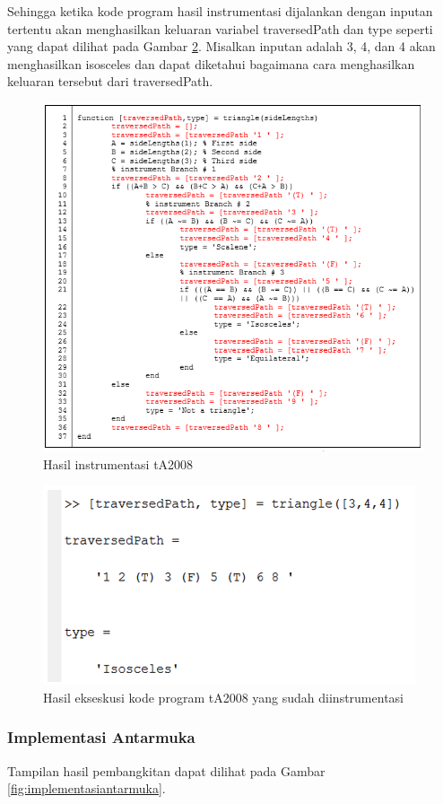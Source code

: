 Sehingga ketika kode program hasil instrumentasi dijalankan dengan inputan tertentu akan menghasilkan keluaran variabel traversedPath dan type seperti yang dapat dilihat pada Gambar \ref{fig:hasilekseskusi}. Misalkan inputan adalah 3, 4, dan 4 akan menghasilkan isosceles dan dapat diketahui bagaimana cara menghasilkan keluaran tersebut dari traversedPath. 
\begin{figure}
	\centering
	\includegraphics[width=0.9\linewidth]{gambar/instrumentasi}
	\caption{Hasil instrumentasi tA2008}
	\label{fig:instrumentasi}
\end{figure}
\begin{figure}
	\centering
	\includegraphics[width=0.7\linewidth]{gambar/hasilekseskusi}
	\caption{Hasil ekseskusi kode program tA2008 yang sudah diinstrumentasi}
	\label{fig:hasilekseskusi}
\end{figure}

\subsubsection*{Implementasi Antarmuka}
Tampilan hasil pembangkitan dapat dilihat pada Gambar \ref{fig:implementasiantarmuka}.

